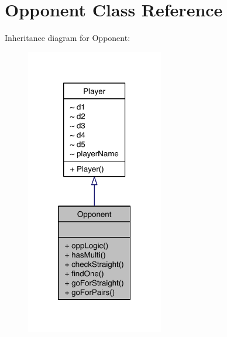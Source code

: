 \hypertarget{class_opponent}{\section{Opponent Class Reference}
\label{class_opponent}
}


Inheritance diagram for Opponent\-:\nopagebreak
\begin{figure}[H]
\begin{center}
\leavevmode
\includegraphics[width=170pt]{class_opponent__inherit__graph}
\end{center}
\end{figure}


